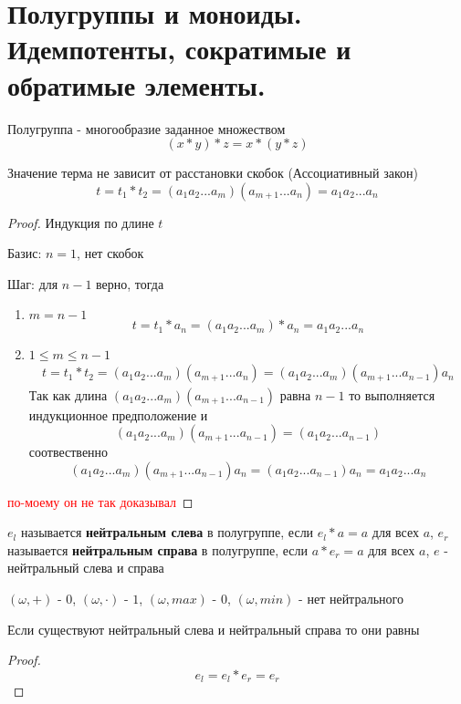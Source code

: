 \documentclass[../main/document.tex]{subfiles}
\begin{document}
\section{Полугруппы и моноиды. Идемпотенты, сократимые и обратимые элементы.}
\begin{dfn}[Полугруппа]
Полугруппа - многообразие заданное множеством
$$(x*y)*z=x*(y*z)$$
\end{dfn}
\begin{exm}
\end{exm}
\begin{thm}
Значение терма не зависит от расстановки скобок (Ассоциативный закон)
$$t=t_1*t_2=(a_{1}a_{2}...a_{m})(a_{m+1}...a_n)=a_{1}a_{2}...a_{n}$$
\begin{proof}
Индукция по длине $t$

Базис: $n=1$, нет скобок

Шаг: для $n-1$ верно, тогда
\begin{enumerate}
\item $m=n-1$
$$t=t_1*a_n=(a_{1}a_{2}...a_{m})*a_n=a_{1}a_{2}...a_{n}$$
\item $1\leq m\leq n-1$
\begin{multline*}
t=t_1*t_2=(a_{1}a_{2}...a_{m})(a_{m+1}...a_n)=(a_{1}a_{2}...a_{m})(a_{m+1}...a_{n-1})a_n
\end{multline*}
Так как длина $(a_{1}a_{2}...a_{m})(a_{m+1}...a_{n-1})$ равна $n-1$ то выполняется индукционное предположение и
$$(a_{1}a_{2}...a_{m})(a_{m+1}...a_{n-1})=(a_{1}a_{2}...a_{n-1})$$
соотвественно
$$(a_{1}a_{2}...a_{m})(a_{m+1}...a_{n-1})a_n=
(a_{1}a_{2}...a_{n-1})a_n=a_{1}a_{2}...a_{n}$$
\end{enumerate}
\textcolor{red}{по-моему он не так доказывал}
\end{proof}
\end{thm}
\begin{dfn}
$e_l$ называется \textbf{нейтральным слева} в полугруппе, если $e_l*a=a$ для всех $a$,
$e_r$ называется \textbf{нейтральным справа} в полугруппе, если $a*e_r=a$ для всех $a$,
$e$ - нейтральный слева и справа
\end{dfn}
\begin{exm}

$(\omega,+)$ - $0$, $(\omega,\cdot)$ - $1$, $(\omega,max)$ - $0$, $(\omega,min)$ - нет нейтрального
\end{exm}
\begin{thm}
Если существуют нейтральный слева и нейтральный справа то они равны
\begin{proof}
$$e_l=e_l*e_r=e_r$$
\end{proof}
\end{thm}
\end{document}
